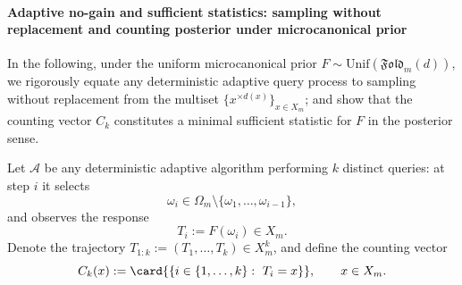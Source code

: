 \paragraph{Adaptive no-gain and sufficient statistics: sampling without replacement and counting posterior under microcanonical prior}
In the following, under the uniform microcanonical prior \(F\sim\mathrm{Unif}(\mathfrak{Fold}_m(d))\),
we rigorously equate any deterministic adaptive query process to sampling without replacement from the multiset \(\{x^{\times d(x)}\}_{x\in X_m}\);
and show that the counting vector \(C_k\) constitutes a minimal sufficient statistic for \(F\) in the posterior sense.

\begin{definition}\label{def:pom-microcanonical-adaptive-trajectory-counts}
Let \(\mathcal{A}\) be any deterministic adaptive algorithm performing \(k\) distinct queries: at step \(i\) it selects
\[
\omega_i\in\Omega_m\setminus\{\omega_1,\dots,\omega_{i-1}\},
\]
and observes the response
\[
T_i:=F(\omega_i)\in X_m.
\]
Denote the trajectory \(T_{1:k}:=(T_1,\dots,T_k)\in X_m^k\), and define the counting vector
\[
C_k(x):=\card{\{i\in\{1,\dots,k\}:\ T_i=x\}},\qquad x\in X_m.
\]
\end{definition}

